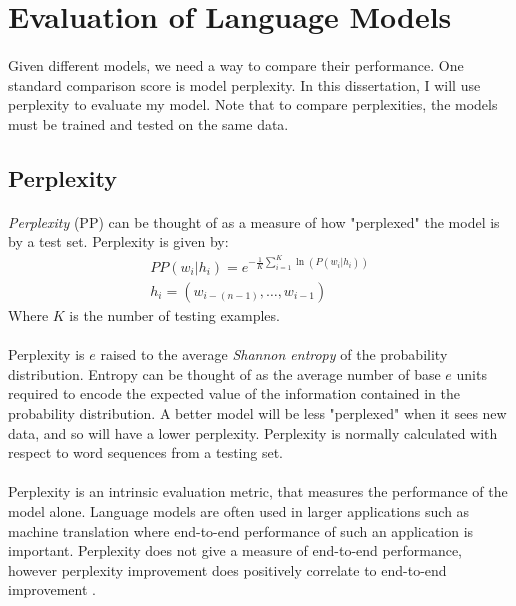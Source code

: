 \section {Evaluation of Language Models}
\paragraph{}
Given different models, we need a way to compare their performance. One standard comparison score is model perplexity. In this dissertation, I will use perplexity to evaluate my model. Note that to compare perplexities, the models must be trained and tested on the same data.
\subsection{Perplexity} \label{sec:perplexity}
\paragraph{}
\emph{Perplexity} (PP) can be thought of as a measure of how "perplexed" the model is by a test set.
Perplexity is given by:
\begin{align}
PP(w_i | h_i)=e^{- \frac{1}{K} \sum_{i=1}^K \ln( P(w_i | h_i) ) } \label{eq:perplexity}
\\ h_i = ( w_{i-(n-1)},\dots, w_{i-1} ) \nonumber
\end{align}
Where $K$ is the number of testing examples. 
\paragraph{}
Perplexity is $e$ raised to the average \emph{Shannon entropy} of the probability distribution. Entropy can be thought of as the average number of base $e$ units required to encode the expected value of the information contained in the probability distribution. A better model will be less "perplexed" when it sees new data, and so will have a lower perplexity.  Perplexity is normally calculated with respect to word sequences from a testing set. 
\paragraph{}
Perplexity is an intrinsic evaluation metric, that measures the performance of the model alone. Language models are often used in larger applications such as machine translation where end-to-end performance of such an application is important. Perplexity does not give a measure of end-to-end performance, however perplexity improvement does positively correlate to end-to-end improvement \cite{Jurafsky2009}.
